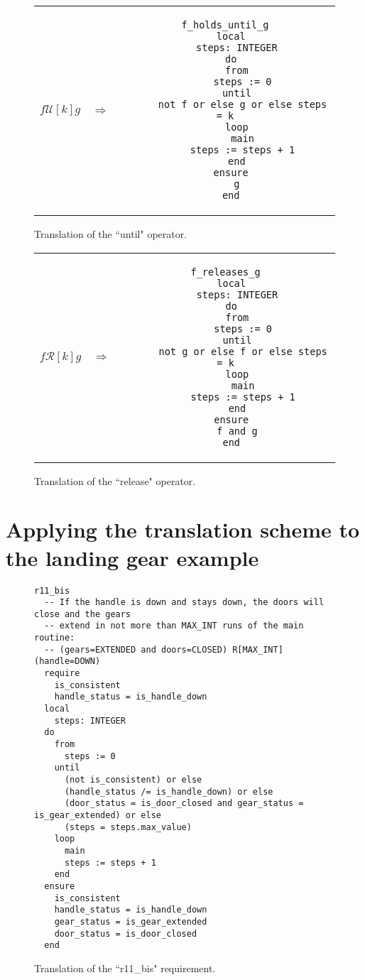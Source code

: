 \begin{figure}
\begin{tabular}{c c c}
$f \mathcal{U}[k] g$
&
$\Longrightarrow$
&
\begin{lstlisting}
f_holds_until_g
  local
    steps: INTEGER
  do
    from
      steps := 0
    until
      not f or else g or else steps = k
    loop
      main
      steps := steps + 1
    end
  ensure
    g
  end
\end{lstlisting}
\end{tabular}
\caption{Translation of the ``until" operator.}
\label{fig:ltl_until_eiffel}
\end{figure}

\begin{figure}
\begin{tabular}{c c c}
$f \mathcal{R}[k] g$
&
$\Longrightarrow$
&
\begin{lstlisting}
f_releases_g
  local
    steps: INTEGER
  do
    from
      steps := 0
    until
      not g or else f or else steps = k
    loop
      main
      steps := steps + 1
    end
  ensure
    f and g
  end
\end{lstlisting}
\end{tabular}
\caption{Translation of the ``release" operator.}
\label{fig:ltl_release_eiffel}
\end{figure}


\section{Applying the translation scheme to the landing gear example}
\label{sec:applying_to_example}

\begin{figure}
\begin{lstlisting}
r11_bis
  -- If the handle is down and stays down, the doors will close and the gears
  -- extend in not more than MAX_INT runs of the main routine:
  -- (gears=EXTENDED and doors=CLOSED) R[MAX_INT] (handle=DOWN)
  require
    is_consistent  
  	handle_status = is_handle_down
  local
    steps: INTEGER
  do
    from
      steps := 0
    until
      (not is_consistent) or else
      (handle_status /= is_handle_down) or else
      (door_status = is_door_closed and gear_status = is_gear_extended) or else
      (steps = steps.max_value)
    loop
      main
      steps := steps + 1
    end
  ensure
  	is_consistent  
    handle_status = is_handle_down
    gear_status = is_gear_extended
    door_status = is_door_closed
  end
\end{lstlisting}
\caption{Translation of the ``r11\_bis" requirement.}
\label{fig:r11_bis_translation}
\end{figure}


